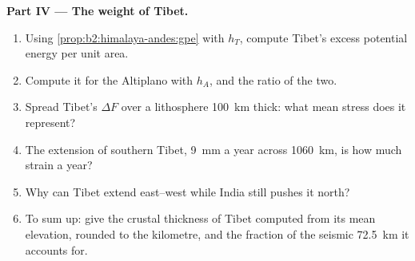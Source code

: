 \begin{problem}
\noindent\textbf{Part IV --- The weight of Tibet.}
\begin{enumerate}[resume]
\item Using \cref{prop:b2:himalaya-andes:gpe} with $h_T$, compute Tibet's excess potential
energy per unit area.
\item Compute it for the Altiplano with $h_A$, and the ratio of the two.
\item Spread Tibet's $\Delta F$ over a lithosphere \qty{100}{km} thick: what mean stress does
it represent?
\item The extension of southern Tibet, \qty{9}{mm} a year across \qty{1060}{km}, is how much
strain a year?
\item Why can Tibet extend east--west while India still pushes it north?
\item To sum up: give the crustal thickness of Tibet computed from its mean elevation, rounded
to the kilometre, and the fraction of the seismic \qty{72.5}{km} it accounts for.
\end{enumerate}
\end{problem}
